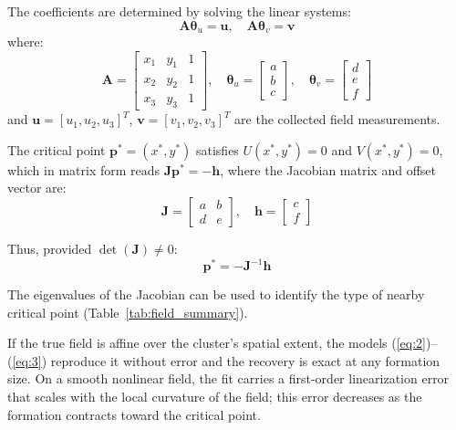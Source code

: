 \documentclass[lettersize,journal]{IEEEtran}
\begin{document}
The coefficients are determined by solving the linear systems:
\begin{equation}\label{eq:4}
\mathbf{A}\boldsymbol{\theta}_u = \mathbf{u}, \quad \mathbf{A}\boldsymbol{\theta}_v = \mathbf{v}
\end{equation}
where:
\begin{equation}\label{eq:5}
\mathbf{A} = \begin{bmatrix} x_1 & y_1 & 1 \\ x_2 & y_2 & 1 \\ x_3 & y_3 & 1 \end{bmatrix}, \quad \boldsymbol{\theta}_u = \begin{bmatrix} a \\ b \\ c \end{bmatrix}, \quad \boldsymbol{\theta}_v = \begin{bmatrix} d \\ e \\ f \end{bmatrix}
\end{equation}
and $\mathbf{u} = [u_1, u_2, u_3]^T$, $\mathbf{v} = [v_1, v_2, v_3]^T$ are the collected field measurements.

The critical point $\mathbf{p}^* = (x^*, y^*)$ satisfies $U(x^*, y^*) = 0$ and $V(x^*, y^*) = 0$, which in matrix form reads $\mathbf{J}\mathbf{p}^* = -\mathbf{h}$, where the Jacobian matrix and offset vector are:
\begin{equation}\label{eq:8}
\mathbf{J} = \begin{bmatrix} a & b \\ d & e \end{bmatrix}, \quad \mathbf{h} = \begin{bmatrix} c \\ f \end{bmatrix}
\end{equation}

Thus, provided $\det(\mathbf{J}) \neq 0$:
\begin{equation}\label{eq:9}
\mathbf{p}^* = -\mathbf{J}^{-1}\mathbf{h}
\end{equation}

The eigenvalues of the Jacobian can be used to identify the type of nearby critical point (Table~\ref{tab:field_summary}).

If the true field is affine over the cluster's spatial extent, the models (\ref{eq:2})--(\ref{eq:3}) reproduce it without error and the recovery is exact at any formation size. On a smooth nonlinear field, the fit carries a first-order linearization error that scales with the local curvature of the field; this error decreases as the formation contracts toward the critical point.
\end{document}
